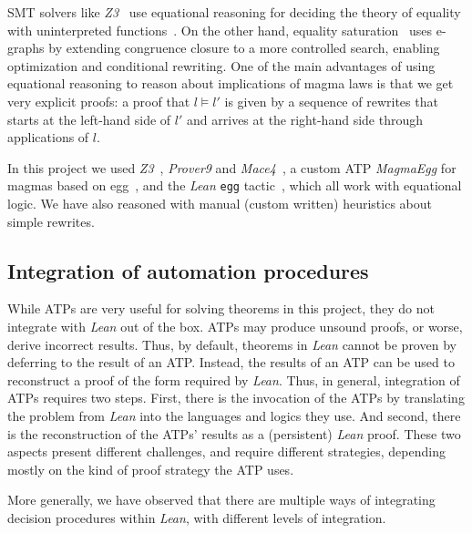SMT solvers like \emph{Z3}~\cite{DBLP:conf/tacas/MouraB08} use equational reasoning for deciding the theory of equality with uninterpreted functions~\cite{DBLP:series/txtcs/KroeningS16,DBLP:conf/cade/MouraB07}.
On the other hand, equality saturation~\cite{DBLP:journals/pacmpl/WillseyNWFTP21} uses e-graphs by extending congruence closure to a more controlled search, enabling optimization and conditional rewriting.
One of the main advantages of using equational reasoning to reason about implications of magma laws is that we get very explicit proofs: a proof that $l \models l'$ is given by a sequence of rewrites that starts at the left-hand side of $l'$ and arrives at the right-hand side through applications of $l$.

In this project we used \emph{Z3}~\cite{DBLP:conf/tacas/MouraB08}, \emph{Prover9} and \emph{Mace4}~\cite{prover9-mace4}, a custom ATP \emph{MagmaEgg} for magmas based on egg~\cite{DBLP:journals/pacmpl/WillseyNWFTP21}, and the \emph{Lean} \texttt{egg} tactic~\cite{DBLP:journals/pacmpl/KoehlerGBGTS24,rossel2024equality}, which all work with equational logic. We have also reasoned with manual (custom written) heuristics about simple rewrites.

\subsection{Integration of automation procedures}
\label{sec:proof-reconstruction}

While ATPs are very useful for solving theorems in this project, they do not integrate with \emph{Lean} out of the box.
ATPs may produce unsound proofs, or worse, derive incorrect results.
Thus, by default, theorems in \emph{Lean} cannot be proven by deferring to the result of an ATP.
Instead, the results of an ATP can be used to reconstruct a proof of the form required by \emph{Lean}.
Thus, in general, integration of ATPs requires two steps.
First, there is the invocation of the ATPs by translating the problem from \emph{Lean} into the languages and logics they use.
And second, there is the reconstruction of the ATPs' results as a (persistent) \emph{Lean} proof.
These two aspects present different challenges, and require different strategies, depending mostly on the kind of proof strategy the ATP uses.

More generally, we have observed that there are multiple ways of integrating decision procedures within \emph{Lean}, with different levels of integration.

